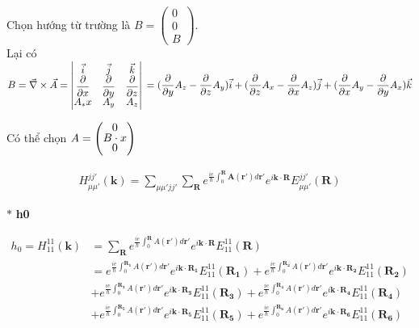 \documentclass{report}
\begin{document}
Chọn hướng từ trường là $\renewcommand{\arraystretch}{0.7} B = \begin{pmatrix} 0  \\ 0  \\ B  \end{pmatrix}$. \\
\noindent Lại có $B = \vec{\nabla} \times \vec{A} =
	\begin{vmatrix}
		\vec{i}                      & \vec{j}                      & \vec{k}                      \\
		\dfrac{\partial}{\partial x} & \dfrac{\partial}{\partial y} & \dfrac{\partial}{\partial z} \\ A_*x & A_y & A_z
	\end{vmatrix}\\
	= (\dfrac{\partial}{\partial y}A_z - \dfrac{\partial}{\partial z}A_y)\vec{i} + (\dfrac{\partial}{\partial z}A_x - \dfrac{\partial}{\partial x}A_z)\vec{j} + (\dfrac{\partial}{\partial x}A_y - \dfrac{\partial}{\partial y}A_x)\vec{k}$

\noindent Có thể chọn $A = \renewcommand{\arraystretch}{0.7} \begin{pmatrix} 0  \\ B\cdot x  \\ 0  \end{pmatrix}$

\begin{align*}
	H_{\mu \mu'}^{jj'}(\textbf{k}) = \sum_{\mu\mu' jj'} \sum_{\textbf{R}} e^{\frac{ie}{\hbar}\int_{0}^{\textbf{R}} \textbf{A}(\mathbf{r'})d\mathbf{r'} } e^{i \mathbf{k}\cdot\textbf{R}} E_{\mu\mu'}^{jj'}(\textbf{R})
\end{align*}

\noindent $\ast$ \textbf{h0}

\begin{align*}
	h_0 = H_{11}^{11}(\textbf{k}) & = \sum_{\textbf{R}} e^{\frac{ie}{\hbar}\int_{0}^{\mathbf{R}}A(\mathbf{r'})d\mathbf{r'}}e^{i\mathbf{k\cdot R}} E_{11}^{11}(\mathbf{R})                                                                                                               \\
	                              & = e^{\frac{ie}{\hbar}\int_{0}^{\mathbf{R_1}}A(\mathbf{r'})d\mathbf{r'}}e^{i\mathbf{k\cdot R_1}} E_{11}^{11}(\mathbf{R_1}) + e^{\frac{ie}{\hbar}\int_{0}^{\mathbf{R_2}}A(\mathbf{r'})d\mathbf{r'}}e^{i\mathbf{k\cdot R_2}} E_{11}^{11}(\mathbf{R_2}) \\
	                              & + e^{\frac{ie}{\hbar}\int_{0}^{\mathbf{R_3}}A(\mathbf{r'})d\mathbf{r'}}e^{i\mathbf{k\cdot R_3}} E_{11}^{11}(\mathbf{R_3}) + e^{\frac{ie}{\hbar}\int_{0}^{\mathbf{R_4}}A(\mathbf{r'})d\mathbf{r'}}e^{i\mathbf{k\cdot R_4}} E_{11}^{11}(\mathbf{R_4}) \\
	                              & + e^{\frac{ie}{\hbar}\int_{0}^{\mathbf{R_5}}A(\mathbf{r'})d\mathbf{r'}}e^{i\mathbf{k\cdot R_5}} E_{11}^{11}(\mathbf{R_5}) + e^{\frac{ie}{\hbar}\int_{0}^{\mathbf{R_6}}A(\mathbf{r'})d\mathbf{r'}}e^{i\mathbf{k\cdot R_6}} E_{11}^{11}(\mathbf{R_6})
\end{align*}
\end{document}
